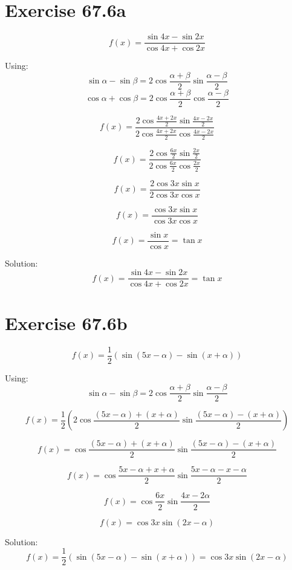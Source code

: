 \documentclass[a4paper, 10pt]{scrartcl}
\begin{document}
\section{Exercise 67.6a}

\[f(x) = \frac{\sin{4x} - \sin{2x}}{\cos{4x} + \cos{2x}}\]

Using:
\[\sin{\alpha} - \sin{\beta} = 2\cos{\frac{\alpha + \beta}{2}}\sin{\frac{\alpha - \beta}{2}}\]
\[\cos{\alpha} + \cos{\beta} = 2\cos{\frac{\alpha + \beta}{2}}\cos{\frac{\alpha - \beta}{2}}\]

\[f(x) = \frac{2\cos{\frac{4x + 2x}{2}}\sin{\frac{4x - 2x}{2}}}
              {2\cos{\frac{4x + 2x}{2}}\cos{\frac{4x - 2x}{2}}}\]

\[f(x) = \frac{2\cos{\frac{6x}{2}}\sin{\frac{2x}{2}}}
              {2\cos{\frac{6x}{2}}\cos{\frac{2x}{2}}}\]

\[f(x) = \frac{2\cos{3x}\sin{x}}
              {2\cos{3x}\cos{x}}\]

\[f(x) = \frac{\cos{3x}\sin{x}}
              {\cos{3x}\cos{x}}\]

\[f(x) = \frac{\sin{x}}{\cos{x}} = \tan{x}\]

Solution:
\[f(x) = \frac{\sin{4x} - \sin{2x}}{\cos{4x} + \cos{2x}} = \tan{x}\]

\section{Exercise 67.6b}

\[f(x) = \frac{1}{2}(\sin{(5x - \alpha)} - \sin{(x + \alpha)})\]

Using:
\[\sin{\alpha} - \sin{\beta} = 2\cos{\frac{\alpha + \beta}{2}}\sin{\frac{\alpha - \beta}{2}}\]

\[f(x) = \frac{1}{2}\left(2\cos{\frac{(5x - \alpha) + (x + \alpha)}{2}}
                      \sin{\frac{(5x - \alpha) - (x + \alpha)}{2}}\right)\]

\[f(x) = \cos{\frac{(5x - \alpha) + (x + \alpha)}{2}}
         \sin{\frac{(5x - \alpha) - (x + \alpha)}{2}}\]

\[f(x) = \cos{\frac{5x - \alpha + x + \alpha}{2}}
         \sin{\frac{5x - \alpha - x - \alpha}{2}}\]

\[f(x) = \cos{\frac{6x}{2}}\sin{\frac{4x - 2\alpha}{2}}\]

\[f(x) = \cos{3x}\sin{(2x - \alpha)}\]

Solution:
\[f(x) = \frac{1}{2}(\sin{(5x - \alpha)} - \sin{(x + \alpha)}) = \cos{3x}\sin{(2x - \alpha)}\]
\end{document}
